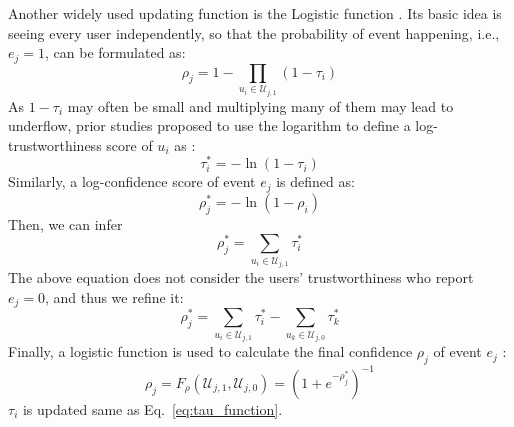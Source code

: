 Another widely used updating function is the Logistic function \citep{yin2008truth}. Its basic idea is seeing every user independently, so that the probability of event happening, i.e., $e_j=1$, can be formulated as:
\begin{equation}
	\rho_j = 1 - \prod_{u_i \in \mathcal U_{j,1}} (1-\tau_i)
\end{equation}
As $1-\tau_i$ may often be small and multiplying many of them may lead to underflow, prior studies proposed to use the logarithm to define a log-trustworthiness score of $u_i$ as \citep{yin2008truth}:
\begin{equation}
	\tau_i^* = - \ln(1-\tau_i)
\end{equation}
Similarly, a log-confidence score of event $e_j$ is defined as:
\begin{equation}
	\rho_j^* = - \ln(1-\rho_i)
\end{equation}
Then, we can infer 
\begin{equation}
	\rho_j^* = \sum_{u_i \in \mathcal U_{j,1}} \tau_i^*
\end{equation}
The above equation does not consider the users' trustworthiness who report $e_j=0$, and thus we refine it:
\begin{equation}
	\rho_j^* = \sum_{u_i \in \mathcal U_{j,1}} \tau_i^* - \sum_{u_k \in \mathcal U_{j,0}} \tau_k^*
\end{equation}
Finally, a logistic function is used to calculate the final confidence $\rho_j$ of event $e_j$ \citep{yin2008truth}:
\begin{equation}
	\rho_j = F_\rho(\mathcal U_{j,1}, \mathcal U_{j,0}) = (1+e^{-\rho_j^*})^{-1}
	\label{eq:rho_function_log}
\end{equation}
$\tau_i$ is updated same as Eq.~\ref{eq:tau_function}.